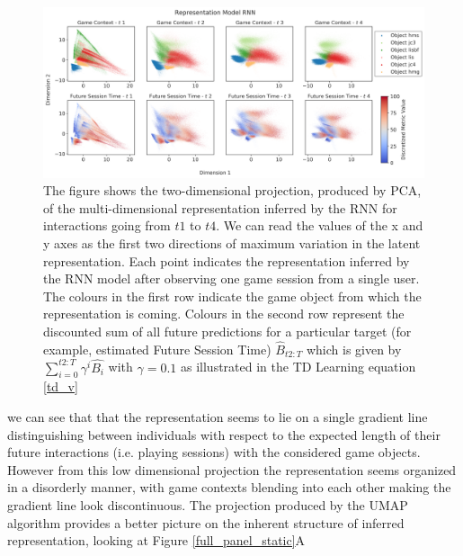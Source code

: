 \begin{figure}[ht]
\centering
\includegraphics[width=\textwidth]{images/chapter_4/rnn_future_sess_pca.png}
\caption[\textbf{Lower dimensional representation of the latent state generated by the RNN architecture using PCA}]{The figure shows the two-dimensional projection, produced by PCA, of the multi-dimensional representation inferred by the RNN for interactions going from $t1$ to $t4$. We can read the values of the x and y axes as the first two directions of maximum variation in the latent representation. Each point indicates the representation inferred by the RNN model after observing one game session from a single user. The colours in the first row indicate the game object from which the representation is coming. Colours in the second row represent the discounted sum of all future predictions for a particular target (for example, estimated Future Session Time) $\widehat{B}_{t2:T}$ which is given by $\sum_{i=0}^{t2:T} \gamma^i\widehat{B_i}$ with $\gamma=0.1$ as illustrated in the TD Learning equation \ref{td_v}}
\label{temporal_panel_rnn_pca}
\end{figure}

we can see that that the representation seems to lie on a single gradient line distinguishing between individuals with respect to the expected length of their future interactions (i.e. playing sessions) with the considered game objects. However from this low dimensional projection the representation seems organized in a disorderly manner, with game contexts blending into each other making the gradient line look discontinuous. The projection produced by the UMAP algorithm provides a better picture on the inherent structure of inferred representation, looking at Figure \ref{full_panel_static}A 

